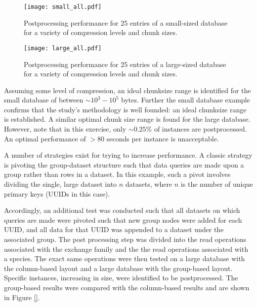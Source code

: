 \begin{figure}
  \begin{center}
    \texttt{[image: small\_all.pdf]}
    \caption[]{
      \label{fig:small_db}
      Postprocessing performance for 25 entries of a small-sized database for a 
      variety of compression levels and chunk sizes.}
  \end{center}
\end{figure}

\begin{figure}
  \begin{center}
    \texttt{[image: large\_all.pdf]}
    \caption[]{
      \label{fig:large_db}
      Postprocessing performance for 25 entries of a large-sized database for a
      variety of compression levels and chunk sizes.}
  \end{center}
\end{figure}

Assuming some level of compression, an ideal chunksize range is identified for
the small database of between $\sim 10^3 - 10^5$ bytes. Further the small
database example confirms that the study's methodology is well founded: an ideal
chunksize range is established. A similar optimal chunk size range is found for
the large database. However, note that in this exercise, only $\sim 0.25\%$ of
instances are postprocessed. An optimal performance of $> 80$ seconds per
instance is unacceptable.

A number of strategies exist for trying to increase performance. A classic
strategy is pivoting the group-dataset structure such that data queries are made
upon a group rather than rows in a dataset. In this example, such a pivot
involves dividing the single, large dataset into $n$ datasets, where $n$ is the
number of unique primary keys (UUIDs in this case). 

Accordingly, an additional test was conducted such that all datasets on which
queries are made were pivoted such that new group nodes were added for each
UUID, and all data for that UUID was appended to a dataset under the associated
group. The post processing step was divided into the read operations associated
with the exchange family and the the read operations associated with a
species. The exact same operations were then tested on a large database with the
column-based layout and a large database with the group-based layout. Specific
instances, increasing in size, were identified to be postprocessed. The
group-based results were compared with the column-based results and are shown in
Figure \ref{}.


